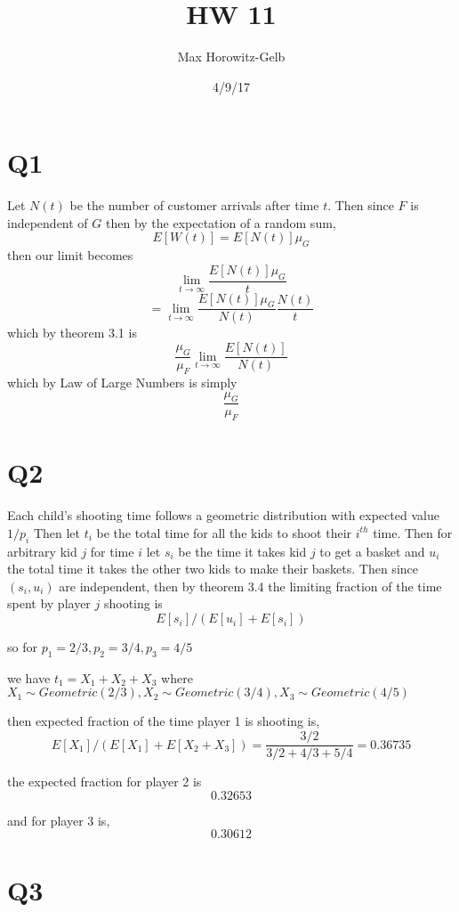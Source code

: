 \documentclass{article}
\title{HW 11}
\author{Max Horowitz-Gelb}
\date{4/9/17}
\begin{document}
\maketitle
\section*{Q1}
Let $N(t)$ be the number of customer arrivals after time $t$. 
Then since $F$ is independent of $G$ then by the expectation of a random sum,
$$
E[W(t)] = E[N(t)]\mu_G
$$
then our limit becomes
$$
\lim_{t \to \infty} \frac{E[N(t)]\mu_G}{t} 
$$
$$
= \lim_{t \to \infty} \frac{E[N(t)]\mu_G}{N(t)}\frac{N(t)}{t}
$$
which by theorem 3.1 is
$$
\frac{\mu_G}{\mu_F} \lim_{t \to \infty} \frac{E[N(t)]}{N(t)} 
$$
which by Law of Large Numbers is simply
$$
\frac{\mu_G}{\mu_F}
$$

\section*{Q2}
Each child's shooting time follows a geometric distribution with expected value $1/p_i$
Then let $t_i$ be the total time for all the kids to shoot their $i^{th}$ time. 
Then for arbitrary kid $j$ for time $i$ let 
$s_i$ be the time it takes kid $j$ to get a basket and $u_i$  the total time it takes the other two kids to make their baskets. 
Then since $(s_i, u_i)$ are independent, then by theorem 3.4 the limiting fraction of the time spent by player $j$ shooting is 
$$
E[s_i] / (E[u_i] + E[s_i])
$$  

so for $p_1 = 2/3, p_2 = 3/4, p_3 = 4/5$ 

we have $t_1 = X_1 + X_2 + X_3$ where $X_1 \sim Geometric(2/3), X_2 \sim Geometric(3/4), X_3 \sim Geometric(4/5)$ 

then expected fraction of the time player 1 is shooting is,
$$
E[X_1]/(E[X_1] + E[X_2 + X_3]) = \frac{3/2}{3/2 + 4/3 + 5/4} = 0.36735
$$

the expected fraction for player 2 is 
$$
0.32653
$$

and for player 3 is,
$$
0.30612
$$

\section*{Q3}
\end{document}
